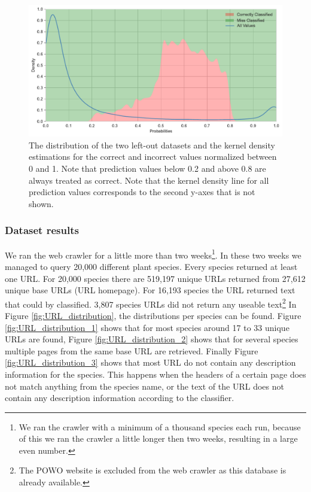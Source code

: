 \documentclass[a4paper, 12pt, oneside]{book} %
\begin{document}
\begin{figure}[htpb]
 \centering
 \includegraphics[width=\textwidth]{figures/predictionvalues_external.pdf}
 \caption[Prediction values of left-out datasets]{The distribution of the two left-out datasets and the kernel density estimations for the correct and incorrect values normalized between 0 and 1. Note that prediction values below 0.2 and above 0.8 are always treated as correct. Note that the kernel density line for all prediction values corresponds to the second y-axes that is not shown.}
 \label{fig:predictionvalues_external}
\end{figure}

\subsubsection{Dataset results}
We ran the web crawler for a little more than two weeks\footnote{We ran the crawler with a minimum of a thousand species each run, because of this we ran the crawler a little longer then two weeks, resulting in a large even number.}.
In these two weeks we managed to query 20,000 different plant species.
Every species returned at least one URL.
For 20,000 species there are 519,197 unique URLs returned from 27,612 unique base URLs (URL homepage).
For 16,193 species the URL returned text that could by classified.
3,807 species URLs did not return any useable text\footnote{The POWO website is excluded from the web crawler as this database is already available.}
In Figure \ref{fig:URL_distribution}, the distributions per species can be found.
Figure \ref{fig:URL_distribution_1} shows that for most species around 17 to 33 unique URLs are found, Figure \ref{fig:URL_distribution_2} shows that for several species multiple pages from the same base URL are retrieved.
Finally Figure \ref{fig:URL_distribution_3} shows that most URL do not contain any description information for the species.
This happens when the headers of a certain page does not match anything from the species name, or the text of the URL does not contain any description information according to the classifier.
\end{document}

